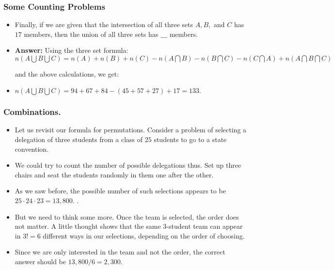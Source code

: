 %

\begin{frame}%
 \frametitle{Some Counting Problems}
  \begin{itemize}%
 
\item 
Finally, if we are given that  the intersection of all three
sets $A, B,$ and $C$  has $17$ members, then the union of all three sets has 
$\_\_\_$   members.

\item {\bf Answer:}
Using the three set formula:
$n(A \bigcup B \bigcup C) = n(A)+n(B) + n(C) -n(A\bigcap B)-n(B\bigcap
C)-n(C\bigcap A) + n(A\bigcap B \bigcap C)$

and the above calculations, we get:
\item 
$n(A \bigcup B \bigcup C) = 94+67+84-(45+57+27)+17 = 133$.





\end{itemize}
\end{frame}

%





\begin{frame}%
 \frametitle{Combinations.}
  \begin{itemize}%
 
\item Let us revisit our formula for permutations. Consider a problem of
selecting a delegation of three students from a class of $25$ students
to go to a state convention.

\item We could try to count the number of possible delegations thus.
Set up three chairs and seat the students randomly in them one after the
other.

\item As we saw before, the possible number of such selections appears
to be $25\cdot 24 \cdot 23 = 13,800$.
.

\item But we need to think some more. Once the team is selected, the
order does not matter. A little thought shows that the same $3$-student
team can appear in $3!=6$ different ways in our selections, depending on
the order of choosing.

\item Since we are only interested in the team and not the order, the
correct answer  should be $13,800/6 = 2,300$.



\end{itemize}
\end{frame}

